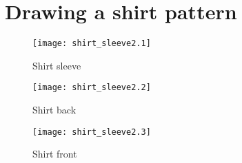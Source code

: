 \documentclass{article}
\begin{document}
\section*{Drawing a shirt pattern}

\begin{figure}[htb]
\begin{center}
\texttt{[image: shirt\_sleeve2.1]}
\caption{Shirt sleeve}
\end{center}
\end{figure}

\begin{figure}[htb]
\begin{center}
\texttt{[image: shirt\_sleeve2.2]}
\caption{Shirt back}
\end{center}
\end{figure}

\begin{figure}[htb]
\begin{center}
\texttt{[image: shirt\_sleeve2.3]}
\caption{Shirt front}
\end{center}
\end{figure}
\end{document}
